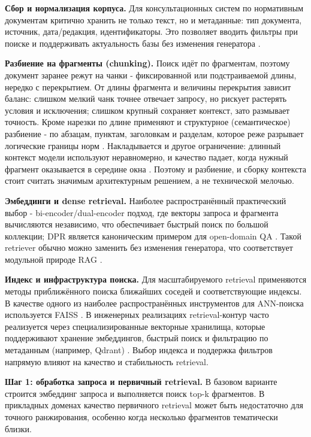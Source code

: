 \documentclass[a4paper,12pt]{article}
\begin{document}
\textbf{Сбор и нормализация корпуса.} Для консультационных систем по нормативным документам критично хранить не только текст, но и метаданные: тип документа, источник, дата/редакция, идентификаторы. Это позволяет вводить фильтры при поиске и поддерживать актуальность базы без изменения генератора \cite{lewis2020rag}.

\textbf{Разбиение на фрагменты (chunking).} Поиск идёт по фрагментам, поэтому документ заранее режут на чанки - фиксированной или подстраиваемой длины, нередко с перекрытием. От длины фрагмента и величины перекрытия зависит баланс: слишком мелкий чанк точнее отвечает запросу, но рискует растерять условия и исключения; слишком крупный сохраняет контекст, зато размывает точность. Кроме нарезки по длине применяют и структурное (семантическое) разбиение - по абзацам, пунктам, заголовкам и разделам, которое реже разрывает логические границы норм \cite{gao2023rag_survey}. Накладывается и другое ограничение: длинный контекст модели используют неравномерно, и качество падает, когда нужный фрагмент оказывается в середине окна \cite{liu2023lost}. Поэтому и разбиение, и сборку контекста стоит считать значимым архитектурным решением, а не технической мелочью.

\textbf{Эмбеддинги и dense retrieval.} Наиболее распространённый практический выбор - bi-encoder/dual-encoder подход, где векторы запроса и фрагмента вычисляются независимо, что обеспечивает быстрый поиск по большой коллекции; DPR является каноническим примером для open-domain QA \cite{karpukhin2020dpr}. Такой retriever обычно можно заменить без изменения генератора, что соответствует модульной природе RAG \cite{gao2023rag_survey}.

\textbf{Индекс и инфраструктура поиска.} Для масштабируемого retrieval применяются методы приближённого поиска ближайших соседей и соответствующие индексы. В качестве одного из наиболее распространённых инструментов для ANN-поиска используется FAISS \cite{johnson2019faiss}. В инженерных реализациях retrieval-контур часто реализуется через специализированные векторные хранилища, которые поддерживают хранение эмбеддингов, быстрый поиск и фильтрацию по метаданным (например, Qdrant) \cite{qdrant_docs}. Выбор индекса и поддержка фильтров напрямую влияют на качество и стабильность retrieval.

\textbf{Шаг 1: обработка запроса и первичный retrieval.} В базовом варианте строится эмбеддинг запроса и выполняется поиск top-k фрагментов. В прикладных доменах качество первичного retrieval может быть недостаточно для точного ранжирования, особенно когда несколько фрагментов тематически близки.
\end{document}
